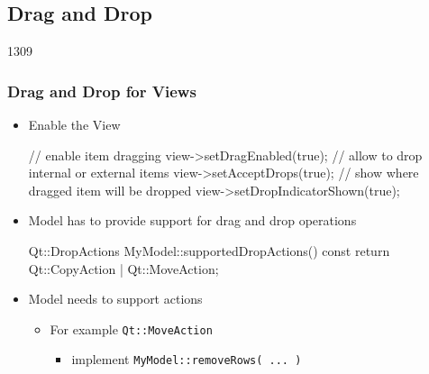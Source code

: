 %
%
%
%

\subsection{Drag and Drop}

\begin{slide}[fragile]{1309}
  \frametitle{Drag and Drop for Views}
  \begin{itemize}
  \item Enable the View
 \begin{cpp}
// enable item dragging
view->setDragEnabled(true);
// allow to drop internal or external items
view->setAcceptDrops(true);
// show where dragged item will be dropped
view->setDropIndicatorShown(true);
 \end{cpp}
\medskip
\item Model has to provide support for drag and drop operations
  \begin{cpp}
Qt::DropActions MyModel::supportedDropActions() const
{
  return Qt::CopyAction | Qt::MoveAction;
}    
  \end{cpp}
\item Model needs to support actions
  \begin{itemize}
  \item For example \texttt{Qt::MoveAction}
    \begin{itemize}
    \item implement \texttt{MyModel::removeRows( ... )}
    \end{itemize}
  \end{itemize}

  \end{itemize}
\end{slide}


